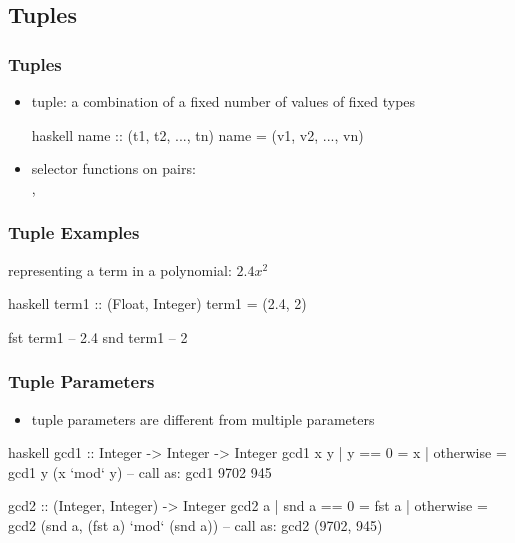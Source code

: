\documentclass[dvipsnames]{beamer}
\theoremstyle{plain}
\begin{document}
\subsection{Tuples}

\begin{frame}[fragile]
  \frametitle{Tuples}

  \begin{itemize}
    \item \alert{tuple}: a combination of a fixed number of values
      of fixed types
    \begin{block}{}
      \begin{pygments}{haskell}
name :: (t1, t2, ..., tn)
name = (v1, v2, ..., vn)
      \end{pygments}
    \end{block}

    \medskip
    \item selector functions on pairs:\\
      , 
  \end{itemize}
\end{frame}

\begin{frame}[fragile]
  \frametitle{Tuple Examples}

  \begin{exampleblock}{representing a term in a polynomial: $2.4x^2$}
    \begin{pygments}{haskell}
term1 :: (Float, Integer)
term1 = (2.4, 2)

fst term1  -- 2.4
snd term1  -- 2
    \end{pygments}
  \end{exampleblock}
\end{frame}

\begin{frame}[fragile]
  \frametitle{Tuple Parameters}

  \begin{itemize}
    \item tuple parameters are different from multiple parameters
  \end{itemize}

  \begin{exampleblock}{}
    \begin{pygments}{haskell}
gcd1 :: Integer -> Integer -> Integer
gcd1 x y
  | y == 0    = x
  | otherwise = gcd1 y (x `mod` y)
-- call as: gcd1 9702 945

gcd2 :: (Integer, Integer) -> Integer
gcd2 a
  | snd a == 0 = fst a
  | otherwise  = gcd2 (snd a, (fst a) `mod` (snd a))
-- call as: gcd2 (9702, 945)
    \end{pygments}
  \end{exampleblock}
\end{frame}
\end{document}
